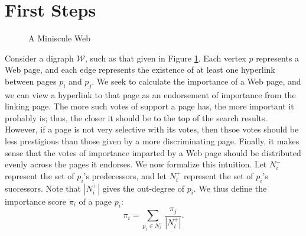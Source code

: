 \documentclass[11pt,letterpaper]{amsart}
\begin{document}
\section{First Steps}
\begin{figure}[h]
  \centering {}
  \caption{A Miniscule Web}
  \label{fig:web}
\end{figure}
Consider a digraph $\mathcal{W}$, such as that given in Figure \ref{fig:web}. Each vertex $p$ represents a Web page, and each edge represents the existence of at least one hyperlink between pages $p_i$ and $p_j$. We seek to calculate the importance of a Web page, and we can view a hyperlink to that page as an endorsement of importance from the linking page. The more such votes of support a page has, the more important it probably is; thus, the closer it should be to the top of the search results. However, if a page is not very selective with its votes, then thsoe votes should be less prestigious than those given by a more discriminating page. Finally, it makes sense that the votes of importance imparted by a Web page should be distributed evenly across the pages it endorses. We now formalize this intuition. Let $N^-_i$ represent the set of $p_i$'s predecessors, and let $N^+_i$ represent the set of $p_i$'s successors. Note that $|N^+_i|$ gives the out-degree of $p_i$. We thus define the importance score $\pi_i$ of a page $p_i$:
\begin{equation}\label{eqn:pi_i}
  \pi_i = \sum_{p_j\in N^-_i}{\frac{\pi_j}{|N^+_i|}}.
\end{equation}
\end{document}

